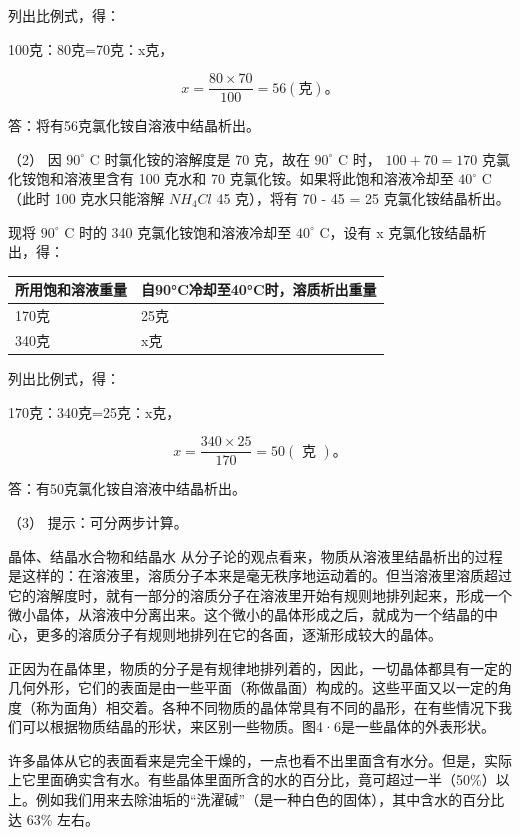 列出比例式，得：

100克：80克=70克：x克，

\[
x = \frac {80 \times 70}{100} = 56 (\text{克})\text{。}
\]

答：将有56克氯化铵自溶液中结晶析出。

（2） 因 \(90^{\circ}\) C 时氯化铵的溶解度是 70 克，故在 \(90^{\circ}\)
C 时， \(100 + 70 = 170\) 克氯化铵饱和溶液里含有 100 克水和 70
克氯化铵。如果将此饱和溶液冷却至 \(40^{\circ}\) C（此时 100 克水只能溶解
\(NH_{4}Cl\) 45 克），将有 70 - 45 = 25 克氯化铵结晶析出。

现将 \(90^{\circ}\) C 时的 340 克氯化铵饱和溶液冷却至 \(40^{\circ}\)
C，设有 x 克氯化铵结晶析出，得：

{\def\LTcaptype{none} %
\begin{longtable}[]{@{}ll@{}}
\toprule\noalign{}
所用饱和溶液重量 & 自90°C冷却至40°C时，溶质析出重量 \\
\midrule\noalign{}
\endhead
\bottomrule\noalign{}
\endlastfoot
170克 & 25克 \\
340克 & x克 \\
\end{longtable}
}

列出比例式，得：

170克：340克=25克：x克，

\[
x = \frac {340 \times 25}{170} = 50 (\text{ 克 })\text{。}
\]

答：有50克氯化铵自溶液中结晶析出。

（3） 提示：可分两步计算。

晶体、结晶水合物和结晶水
从分子论的观点看来，物质从溶液里结晶析出的过程是这样的：在溶液里，溶质分子本来是毫无秩序地运动着的。但当溶液里溶质超过它的溶解度时，就有一部分的溶质分子在溶液里开始有规则地排列起来，形成一个微小晶体，从溶液中分离出来。这个微小的晶体形成之后，就成为一个结晶的中心，更多的溶质分子有规则地排列在它的各面，逐渐形成较大的晶体。

正因为在晶体里，物质的分子是有规律地排列着的，因此，一切晶体都具有一定的几何外形，它们的表面是由一些平面（称做晶面）构成的。这些平面又以一定的角度（称为面角）相交着。各种不同物质的晶体常具有不同的晶形，在有些情况下我们可以根据物质结晶的形状，来区别一些物质。图4·6是一些晶体的外表形状。

许多晶体从它的表面看来是完全干燥的，一点也看不出里面含有水分。但是，实际上它里面确实含有水。有些晶体里面所含的水的百分比，竟可超过一半（50\%）以上。例如我们用来去除油垢的``洗濯碱''（是一种白色的固体），其中含水的百分比达
63\% 左右。

